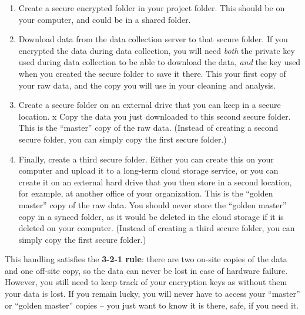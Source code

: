 \begin{enumerate}
	\item Create a secure encrypted folder in your project folder.
  This should be on your computer, and could be in a shared folder.
	\item Download data from the data collection server to that secure folder.
	If you encrypted the data during data collection, you will need \textit{both} the
	private key used during data collection to be able to download the data,
	\textit{and} the key used when you created the secure folder to save it there.
	This your first copy of your raw data, and the copy you will use in your cleaning and analysis.
	\item Create a secure folder on an external drive that you can keep in a secure location.
x	Copy the data you just downloaded to this second secure	folder.
	This is the ``master'' copy of the raw data.
	(Instead of creating a second secure folder, you can simply copy the first secure folder.)
	\item Finally, create a third secure folder.
	Either you can create this on your computer and upload it to a long-term cloud storage service,
	or you can create it on	an external hard drive that you then store in a second location,
	for example, at another office of your organization.
	This is the ``golden master'' copy of the raw	data.
	You should never store the ``golden master'' copy in a synced folder, 
	as it would be deleted in the cloud storage if it is deleted on your computer.
	(Instead of creating a third secure folder, you can simply copy the first secure folder.)
\end{enumerate}

\noindent This handling satisfies the \textbf{3-2-1 rule}:
there are two on-site copies of the data and one off-site copy,
so the data can never be lost in case of hardware failure.
However, you still need to keep track of your encryption keys as without them your data is lost.
If you remain lucky, you will never have to access your ``master'' or ``golden master'' copies --
you just want to know it is there, safe, if you need it.

